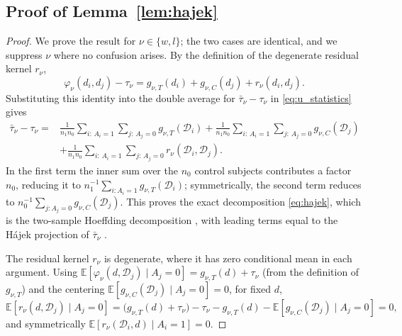 \documentclass[11pt,a4paper]{article}
\newcommand{\E}{\mathbb{E}}
\begin{document}
\subsection{Proof of Lemma~\ref{lem:hajek}} \label{App:Lemma1}
\begin{proof}
We prove the result for $\nu\in\{w,l\}$; the two cases are identical, and we suppress $\nu$ where no confusion arises. By the definition of the degenerate residual kernel
$r_\nu$,
\[
\varphi_\nu(d_i,d_j)-\tau_\nu =
g_{\nu,T}(d_i)+g_{\nu,C}(d_j)+r_\nu(d_i,d_j).
\]
Substituting this identity into the double average for $\bar\tau_\nu-\tau_\nu$ in
\eqref{eq:u_statistics} gives
\begin{align*}
\bar\tau_\nu-\tau_\nu
=&\frac{1}{n_1 n_0}\sum_{i:\,A_i=1}\sum_{j:\,A_j=0}g_{\nu,T}(\mathcal{D}_i) +\frac{1}{n_1 n_0}\sum_{i:\,A_i=1}\sum_{j:\,A_j=0}g_{\nu,C}(\mathcal{D}_j)\\
&+\frac{1}{n_1 n_0}\sum_{i:\,A_i=1}\sum_{j:\,A_j=0}r_\nu(\mathcal{D}_i,\mathcal{D}_j).
\end{align*}
In the first term the inner sum over the $n_0$ control subjects contributes a factor $n_0$, reducing it to $n_1^{-1}\sum_{i:A_i=1}g_{\nu,T}(\mathcal{D}_i)$; symmetrically, the second term reduces to $n_0^{-1}\sum_{j:A_j=0}g_{\nu,C}(\mathcal{D}_j)$. This proves the exact
decomposition \eqref{eq:hajek}, which is the two-sample Hoeffding decomposition
\citep{hoeffding_class_1948, lehmann_elements_1951}, with leading terms equal to the
H\'ajek projection of $\bar\tau_\nu$
\citep[][Thm.~12.6]{vandervaart_asymptotic_1998}. 

The residual kernel $r_\nu$ is degenerate, where it has zero conditional mean in each argument. Using
$\E[\varphi_\nu(d,\mathcal{D}_j)\mid A_j=0]=g_{\nu,T}(d)+\tau_\nu$ (from the definition of
$g_{\nu,T}$) and the centering $\E[g_{\nu,C}(\mathcal{D}_j)\mid A_j=0]=0$, for fixed $d$,
\[
\E[r_\nu(d,\mathcal{D}_j)\mid A_j=0]
=\big(g_{\nu,T}(d)+\tau_\nu\big)-\tau_\nu-g_{\nu,T}(d)
 -\E[g_{\nu,C}(\mathcal{D}_j)\mid A_j=0]=0,
\]
and symmetrically $\E[r_\nu(\mathcal{D}_i,d)\mid A_i=1]=0$.


\end{proof}
\end{document}
